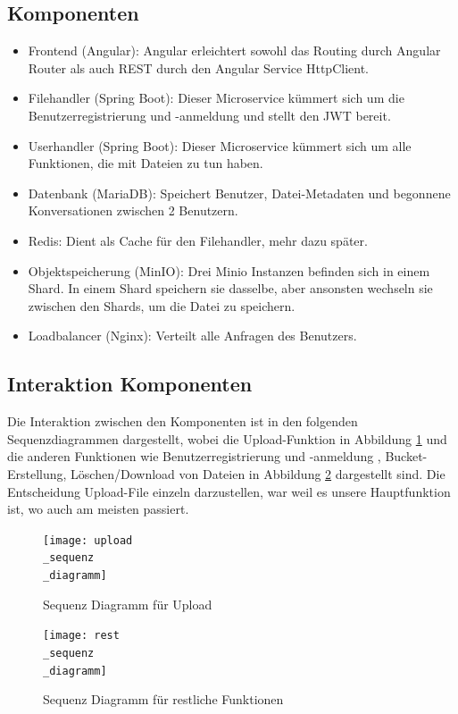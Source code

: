\documentclass[12pt]{report}
\begin{document}
		\subsection{Komponenten}
			\begin{itemize}
				\item Frontend (Angular): Angular erleichtert sowohl das Routing durch Angular Router als auch REST durch den Angular Service HttpClient.
				\item Filehandler (Spring Boot): Dieser Microservice kümmert sich um die Benutzerregistrierung und -anmeldung und stellt den JWT bereit.
				\item Userhandler (Spring Boot): Dieser Microservice kümmert sich um alle Funktionen, die mit Dateien zu tun haben.
				\item Datenbank (MariaDB):  Speichert Benutzer, Datei-Metadaten und begonnene Konversationen zwischen 2 Benutzern. 
				\item Redis: Dient als Cache für den Filehandler, mehr dazu später.
				\item Objektspeicherung (MinIO): Drei Minio Instanzen befinden sich in einem Shard. In einem Shard speichern sie dasselbe, aber ansonsten wechseln sie zwischen den Shards, um die Datei zu speichern.
				\item Loadbalancer (Nginx): Verteilt alle Anfragen des Benutzers.
			\end{itemize}
			
		\subsection{Interaktion Komponenten}
			Die Interaktion zwischen den Komponenten ist in den folgenden Sequenzdiagrammen dargestellt, wobei die Upload-Funktion in Abbildung \ref{fig:upload_sequenz_diagramm} und die anderen Funktionen wie Benutzerregistrierung und -anmeldung , Bucket-Erstellung, Löschen/Download von Dateien in Abbildung \ref{fig:rest_sequenz_diagramm} dargestellt sind. Die Entscheidung Upload-File einzeln darzustellen, war weil es unsere Hauptfunktion ist, wo auch am meisten passiert.
			
			\begin{figure}[h]
				\centering
				\texttt{[image: upload\\\_sequenz\\\_diagramm]}
				\caption{Sequenz Diagramm für Upload}
				\label{fig:upload_sequenz_diagramm}
			\end{figure}
			
			\begin{figure}[h]
				\centering
				\texttt{[image: rest\\\_sequenz\\\_diagramm]}
				\caption{Sequenz Diagramm für restliche Funktionen}
				\label{fig:rest_sequenz_diagramm}
			\end{figure}
		
\end{document}
